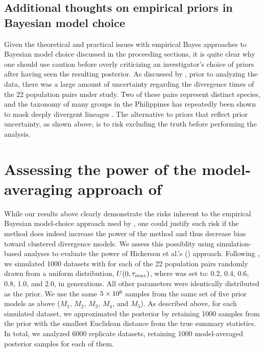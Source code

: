 \documentclass[letterpaper,12pt]{article}
\begin{document}
\begin{linenumbers}
\subsection*{Additional thoughts on empirical priors in Bayesian model choice}
Given the theoretical and practical issues with empirical Bayes approaches to
Bayesian model choice discussed in the proceeding sections, it is quite clear
why one should use caution before overly criticizing an investigator's choice
of priors after having seen the resulting posterior.
As discussed by \citet{Oaks2012}, prior to analyzing the data, there was a
large amount of uncertainty regarding the divergence times of the 22 population
pairs under study.
Two of these pairs represent distinct species, and the taxonomy of many groups
in the Philippines has repeatedly been shown to mask deeply divergent lineages
\citep{RafeDiesmosAlcala2008,Linkem2010,Siler2010,Welton2010,Siler2011HerpMonographs,
    Siler2011,Siler2012,RafeStuart2012,LinkemBrown2013}.
The alternative to priors that reflect prior uncertainty, as shown above, is to
risk excluding the truth before performing the analysis.






\section*{Assessing the power of the model-averaging approach of
    \citet{Hickerson2013}}
While our results above clearly demonstrate the risks inherent to the empirical
Bayesian model-choice approach used by \citet{Hickerson2013}, one could justify
such risk if the method does indeed increase the power of the method and thus
decrease bias toward clustered divergence models.
We assess this possiblity using simulation-based analyses to evaluate the power
of Hickerson et al.'s (\citeyear{Hickerson2013}) approach.
Following \citet{Oaks2012}, we simulated 1000 datasets with \divt{} for each of
the 22 population pairs randomly drawn from a uniform distribution, $U(0,
\tau_{max})$, where  was set to: 0.2, 0.4, 0.6, 0.8, 1.0, and 2.0, in
\globalcoalunit generations.
All other parameters were identically distributed as the prior.
We use the same $5\times 10^{6}$ samples from the same set of five prior models as above
($M_1$, $M_2$, $M_3$, $M_4$, and $M_5$).
As described above, for each simulated dataset, we approximated the posterior
by retaining 1000 samples from the prior with the smallest Euclidean distance
from the true summary statistics.
In total, we analyzed 6000 replicate datasets, retaining 1000 model-averaged
posterior samples for each of them.


\end{linenumbers}
\end{document}

